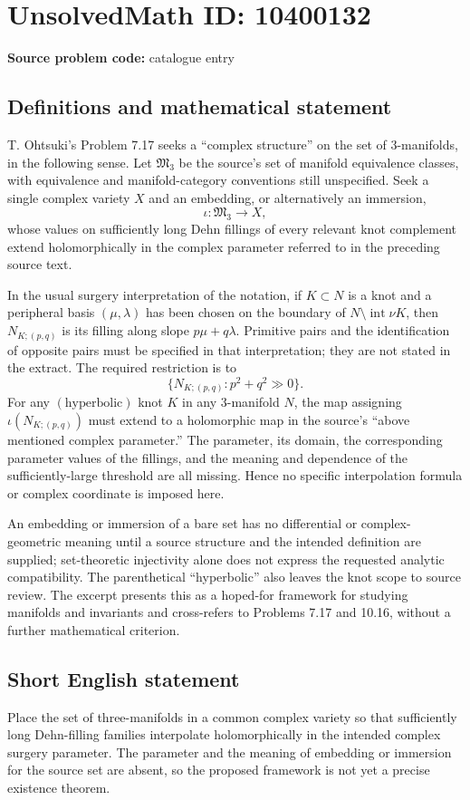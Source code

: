 \documentclass[11pt]{article}
\begin{document}
\section*{UnsolvedMath ID: 10400132}
\textbf{Source problem code:} catalogue entry
\subsection{Definitions and mathematical statement}
T. Ohtsuki's Problem 7.17 seeks a ``complex structure'' on the set of \(3\)-manifolds, in the following sense. Let \(\mathfrak M_3\) be the source's set of manifold equivalence classes, with equivalence and manifold-category conventions still unspecified. Seek a single complex variety \(X\) and an embedding, or alternatively an immersion,
\[
 \iota:\mathfrak M_3\longrightarrow X,
\]
whose values on sufficiently long Dehn fillings of every relevant knot complement extend holomorphically in the complex parameter referred to in the preceding source text.

In the usual surgery interpretation of the notation, if \(K\subset N\) is a knot and a peripheral basis \((\mu,\lambda)\) has been chosen on the boundary of \(N\setminus\operatorname{int}\nu K\), then \(N_{K;(p,q)}\) is its filling along slope \(p\mu+q\lambda\). Primitive pairs and the identification of opposite pairs must be specified in that interpretation; they are not stated in the extract. The required restriction is to
\[
 \{N_{K;(p,q)}:p^2+q^2\gg0\}.
\]
For any \((\text{hyperbolic})\) knot \(K\) in any \(3\)-manifold \(N\), the map assigning \(\iota(N_{K;(p,q)})\) must extend to a holomorphic map in the source's ``above mentioned complex parameter.'' The parameter, its domain, the corresponding parameter values of the fillings, and the meaning and dependence of the sufficiently-large threshold are all missing. Hence no specific interpolation formula or complex coordinate is imposed here.

An embedding or immersion of a bare set has no differential or complex-geometric meaning until a source structure and the intended definition are supplied; set-theoretic injectivity alone does not express the requested analytic compatibility. The parenthetical ``hyperbolic'' also leaves the knot scope to source review. The excerpt presents this as a hoped-for framework for studying manifolds and invariants and cross-refers to Problems 7.17 and 10.16, without a further mathematical criterion.
\subsection{Short English statement}
Place the set of three-manifolds in a common complex variety so that sufficiently long Dehn-filling families interpolate holomorphically in the intended complex surgery parameter. The parameter and the meaning of embedding or immersion for the source set are absent, so the proposed framework is not yet a precise existence theorem.
\end{document}
